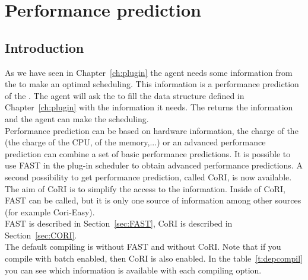 
\chapter{Performance prediction}
\label{chapter:performance}
\section{Introduction}

As we have seen in Chapter~\ref{ch:plugin} the agent needs some information
from the \sed to make an optimal scheduling. This information is a performance
prediction of the \sed. The agent will ask the \sed to fill the data structure
defined in Chapter~\ref{ch:plugin} with the information it needs. The \sed
returns the information and the agent can make the scheduling.\\ Performance
prediction can be based on hardware information, the charge of the \sed (the
charge of the CPU, of the memory,...) or an advanced performance prediction can
combine a set of basic performance predictions. It is possible to use FAST in
the plug-in scheduler to obtain advanced performance predictions. A second
possibility to get performance prediction, called CoRI, is now available.  The
aim of CoRI is to simplify the access to the information. Inside of CoRI, FAST
can be called, but it is only one source of information among other sources
(for example Cori-Easy).\\ FAST is described in Section~\ref{sec:FAST}, CoRI is
described in Section~\ref{sec:CORI}.\\ The default compiling is without FAST
and without CoRI. Note that if you compile with batch enabled, then CoRI is
also enabled.  In the table~\ref{t:depcompil} you can see which information is
available with each compiling option.

